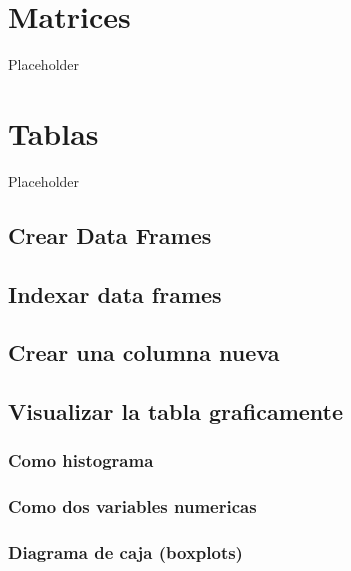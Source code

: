\documentclass[
]{book}
\begin{document}
\hypertarget{matrices}{%
\chapter{Matrices}\label{matrices}}

Placeholder

\hypertarget{tablas}{%
\chapter{Tablas}\label{tablas}}

Placeholder

\hypertarget{crear-data-frames}{%
\section{Crear Data Frames}\label{crear-data-frames}}

\hypertarget{indexar-data-frames}{%
\section{Indexar data frames}\label{indexar-data-frames}}

\hypertarget{crear-una-columna-nueva}{%
\section{Crear una columna nueva}\label{crear-una-columna-nueva}}

\hypertarget{visualizar-la-tabla-graficamente}{%
\section{Visualizar la tabla graficamente}\label{visualizar-la-tabla-graficamente}}

\hypertarget{como-histograma}{%
\subsection{Como histograma}\label{como-histograma}}

\hypertarget{como-dos-variables-numericas}{%
\subsection{Como dos variables numericas}\label{como-dos-variables-numericas}}

\hypertarget{diagrama-de-caja-boxplots}{%
\subsection{Diagrama de caja (boxplots)}\label{diagrama-de-caja-boxplots}}
\end{document}
